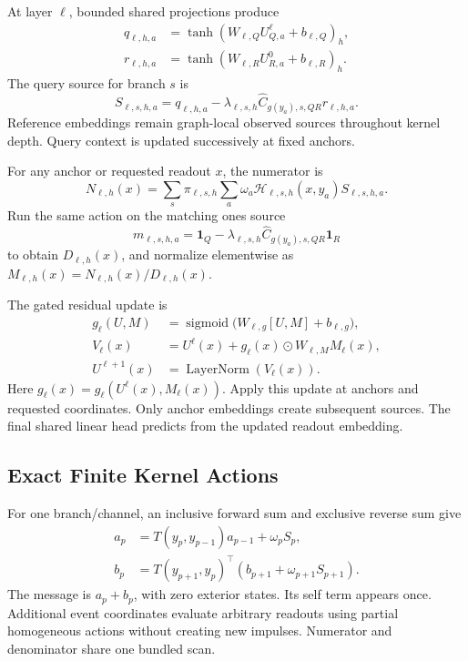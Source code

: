 \documentclass[letterpaper]{article}
\begin{document}
At layer $\ell$, bounded shared projections produce
\begin{align}
 q_{\ell,h,a}&=\tanh(W_{\ell,Q}U^\ell_{Q,a}+b_{\ell,Q})_h,\\
 r_{\ell,h,a}&=\tanh(W_{\ell,R}U^0_{R,a}+b_{\ell,R})_h.
\end{align}
The query source for branch $s$ is
\begin{equation}
 S_{\ell,s,h,a}
 =q_{\ell,h,a}
 -\lambda_{\ell,s,h}\widehat C_{g(y_a),s,QR}r_{\ell,h,a}.
\end{equation}
Reference embeddings remain graph-local observed sources throughout kernel depth. Query context is updated successively at fixed anchors.

For any anchor or requested readout $x$, the numerator is
\begin{equation}
 N_{\ell,h}(x)=
 \sum_s\pi_{\ell,s,h}\sum_a\omega_a
 \mathcal H_{\ell,s,h}(x,y_a)S_{\ell,s,h,a}.
\end{equation}
Run the same action on the matching ones source
\begin{equation}
 m_{\ell,s,h,a}=
 \mathbf1_Q-\lambda_{\ell,s,h}
 \widehat C_{g(y_a),s,QR}\mathbf1_R
\end{equation}
to obtain $D_{\ell,h}(x)$, and normalize elementwise as $M_{\ell,h}(x)=N_{\ell,h}(x)/D_{\ell,h}(x)$.

The gated residual update is
\begin{align}
 g_\ell(U,M)&=\operatorname{sigmoid}
 \big(W_{\ell,g}[U,M]+b_{\ell,g}\big),\\
 V_\ell(x)&=U^\ell(x)+g_\ell(x)\odot W_{\ell,M}M_\ell(x),\\
 U^{\ell+1}(x)&=\operatorname{LayerNorm}(V_\ell(x)).
\end{align}
Here $g_\ell(x)=g_\ell(U^\ell(x),M_\ell(x))$. Apply this update at anchors and requested coordinates. Only anchor embeddings create subsequent sources. The final shared linear head predicts from the updated readout embedding.

\subsection{Exact Finite Kernel Actions}
For one branch/channel, an inclusive forward sum and exclusive reverse sum give
\begin{align}
 a_p&=T(y_p,y_{p-1})a_{p-1}+\omega_pS_p,\\
 b_p&=T(y_{p+1},y_p)^\top(b_{p+1}+\omega_{p+1}S_{p+1}).
\end{align}
The message is $a_p+b_p$, with zero exterior states. Its self term appears once. Additional event coordinates evaluate arbitrary readouts using partial homogeneous actions without creating new impulses. Numerator and denominator share one bundled scan.
\end{document}
